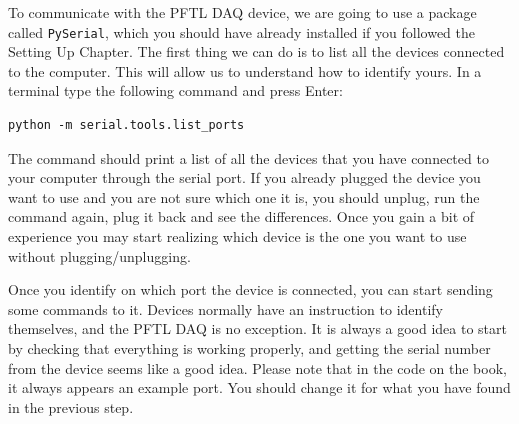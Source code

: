 To communicate with the {PFTL DAQ} device, we are going to use a
package called \texttt{PySerial}, which you should have already
installed if you followed the Setting Up Chapter. The first
thing we can do is to list all the devices connected to the computer.
This will allow us to understand how to identify yours. In a terminal
type the following command and press Enter:

\begin{verbatim}
python -m serial.tools.list_ports
\end{verbatim}

The command should print a list of all the devices that you have
connected to your computer through the serial port. If you already
plugged the device you want to use and you are not sure which one it is,
you should unplug, run the command again, plug it back and see the
differences. Once you gain a bit of experience you may start realizing
which device is the one you want to use without plugging/unplugging.


Once you identify on which port the device is connected, you can start sending some commands to it. Devices normally have an
instruction to identify themselves, and the {PFTL DAQ} is no exception. It is always 
a
good idea to start by checking that everything is working properly, and getting 
the serial
number from the device seems like a good idea. Please note that in the code on the book, it always
appears an example port. You should change it for what you have found in
the previous step.


